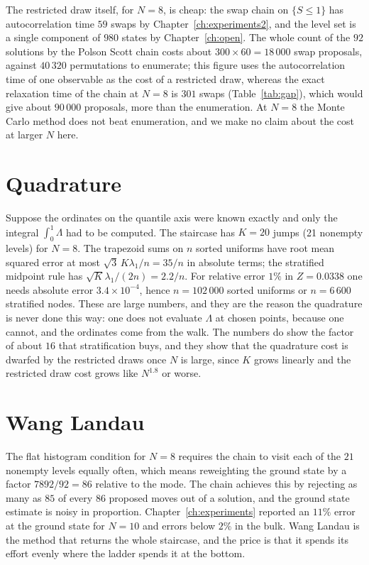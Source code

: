 The restricted draw itself, for $N = 8$, is cheap: the swap chain on $\{ S \le 1 \}$ has autocorrelation time $59$ swaps by Chapter~\ref{ch:experiments2}, and the level set is a single component of $980$ states by Chapter~\ref{ch:open}. The whole count of the $92$ solutions by the Polson Scott chain costs about $300 \times 60 = 18\,000$ swap proposals, against $40\,320$ permutations to enumerate; this figure uses the autocorrelation time of one observable as the cost of a restricted draw, whereas the exact relaxation time of the chain at $N = 8$ is $301$ swaps (Table~\ref{tab:gap}), which would give about $90\,000$ proposals, more than the enumeration. At $N = 8$ the Monte Carlo method does not beat enumeration, and we make no claim about the cost at larger $N$ here.

\section{Quadrature}

Suppose the ordinates on the quantile axis were known exactly and only the integral $\int_0^1 \Lambda$ had to be computed. The staircase has $K = 20$ jumps (21 nonempty levels) for $N = 8$. The trapezoid sums on $n$ sorted uniforms have root mean squared error at most $\sqrt 3 \, K \lambda_1 / n = 35 / n$ in absolute terms; the stratified midpoint rule has $\sqrt{K} \lambda_1 / (2 n) = 2.2 / n$. For relative error $1\%$ in $Z = 0.0338$ one needs absolute error $3.4 \times 10^{-4}$, hence $n = 102\,000$ sorted uniforms or $n = 6\,600$ stratified nodes. These are large numbers, and they are the reason the quadrature is never done this way: one does not evaluate $\Lambda$ at chosen points, because one cannot, and the ordinates come from the walk. The numbers do show the factor of about $16$ that stratification buys, and they show that the quadrature cost is dwarfed by the restricted draws once $N$ is large, since $K$ grows linearly and the restricted draw cost grows like $N^{1.8}$ or worse.

\section{Wang Landau}

The flat histogram condition for $N = 8$ requires the chain to visit each of the $21$ nonempty levels equally often, which means reweighting the ground state by a factor $7892 / 92 = 86$ relative to the mode. The chain achieves this by rejecting as many as $85$ of every $86$ proposed moves out of a solution, and the ground state estimate is noisy in proportion. Chapter~\ref{ch:experiments} reported an $11\%$ error at the ground state for $N = 10$ and errors below $2\%$ in the bulk. Wang Landau is the method that returns the whole staircase, and the price is that it spends its effort evenly where the ladder spends it at the bottom.

